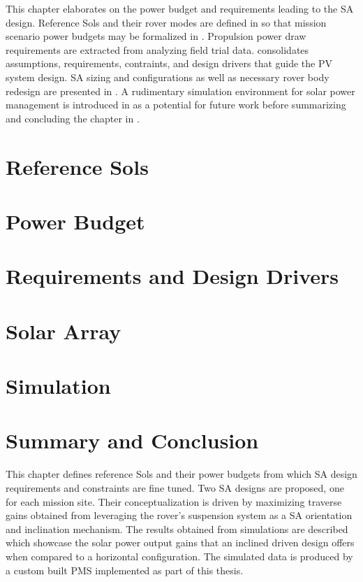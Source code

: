 This chapter elaborates on the power budget and requirements leading to the \ac{SA} design. Reference Sols and their rover modes are defined in  so that mission scenario power budgets may be formalized in . Propulsion power draw requirements are extracted from analyzing field trial data.  consolidates assumptions, requirements, contraints, and design drivers that guide the \ac{PV} system design. \ac{SA} sizing and configurations as well as necessary rover body redesign are presented in . A rudimentary simulation environment for solar power management is introduced in  as a potential for future work before summarizing and concluding the chapter in .

\section{Reference Sols}
\label{sec:Design:ReferenceSols}


\section{Power Budget}
\label{sec:Design:PowerBudget}


\section{Requirements and Design Drivers}
\label{sec:Design:RequirementsAndDesignDrivers}



\section{Solar Array}
\label{sec:Design:SolarArray}


\section{Simulation}
\label{sec:Design:Simulation}


\section{Summary and Conclusion}
\label{sec:Design:SummaryAndConclusion}
This chapter defines reference Sols and their power budgets from which \ac{SA} design requirements and constraints are fine tuned. Two \ac{SA} designs are proposed, one for each mission site. Their conceptualization is driven by maximizing traverse gains obtained from leveraging the rover's suspension system as a \ac{SA} orientation and inclination mechanism. The results obtained from simulations are described which showcase the solar power output gains that an inclined driven design offers when compared to a horizontal configuration. The simulated data is produced by a custom built \ac{PMS} implemented as part of this thesis.
